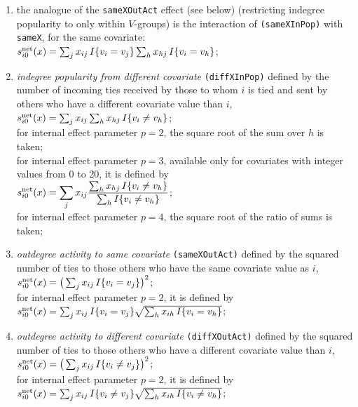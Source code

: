 \documentclass[a4paper,fleqn,11pt]{article}
\newcommand{\+}{\, + \,}
\newcommand{\vit}{\theenumi}
\begin{document}
\begin{enumerate}
\item[$\bigodot$]
  the analogue of the \texttt{sameXOutAct} effect (see below)
  (restricting indegree popularity to only within $V$-groups)
  is the interaction of \texttt{(sameXInPop)} with \texttt{sameX},
  for the same covariate:\\
 $s^{\rm net}_{i\vit}(x) = \sum_j x_{ij}\,I\{v_i = v_j \} \sum_h x_{hj}\, I\{v_i = v_h \} $;\\


 \item {\em indegree popularity from different covariate}
\texttt{(diffXInPop)} defined by the
 number of incoming ties received by those to whom $i$ is tied
 and sent by others who have a different covariate value than $i$,\\
 $s^{\rm net}_{i\vit}(x) = \sum_j x_{ij} \sum_h x_{hj}\, I\{v_i \neq v_h \} $;\\
 for internal effect parameter $p=2$, the square root of the sum over $h$ is taken;\\
 for internal effect parameter $p=3$, available only for
 covariates with integer values from 0 to 20, it is defined by\\
 $\displaystyle s^{\rm net}_{i\vit}(x) = \sum_j x_{ij} \frac{\sum_h x_{hj}\, I\{v_i \neq v_h \}}
                {\sum_h I\{v_i \neq v_h \}} $;\\
 for internal effect parameter $p=4$, the square root of the ratio of sums is taken;

 \item {\em outdegree activity to same covariate}
\texttt{(sameXOutAct)} defined by the
 squared number of ties to those
 others who have the same covariate value as $i$,\\
 $s^{\rm net}_{i\vit}(x) =  \big( \sum_j x_{ij} \, I\{v_i = v_j \}\big)^2 $;\\
 for internal effect parameter $p=2$, it is defined by\\
 $s^{\rm net}_{i\vit}(x) =  \sum_j x_{ij} \, I\{v_i = v_j \}
            \sqrt{\sum_h x_{ih}\, I\{v_i = v_h \}} $;\\

 \item {\em outdegree activity to different covariate}
\texttt{(diffXOutAct)} defined by the
 squared number of ties to those
 others who have a different covariate value than $i$,\\
 $s^{\rm net}_{i\vit}(x) = \big(\sum_j x_{ij} \,I\{v_i \neq v_j \}\big)^2 $;\\
 for internal effect parameter $p=2$, it is defined by\\
 $s^{\rm net}_{i\vit}(x) =  \sum_j x_{ij} \, I\{v_i \neq v_j \}
             \sqrt{\sum_h x_{ih}\, I\{v_i \neq v_h \}} $;\\



\end{enumerate}
\end{document}
